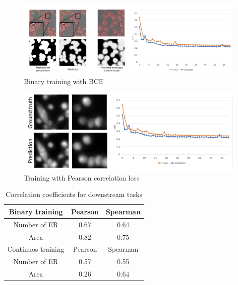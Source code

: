 \begin{figure}[htb]
	\begin{center}
		\includegraphics[width=0.8\linewidth]{bilder/gfp/binary-bce/enlarged.png}
		\caption{Binary training with BCE}\label{fig:gfp-bce-predictions}
	\end{center}
\end{figure}

\begin{figure}[htb]
	\begin{center}
		\includegraphics[width=0.6\linewidth]{bilder/gfp/predictions.png}
		\caption{Training with Pearson correlation loss}\label{fig:gfp-pcc-predictions}
	\end{center}
\end{figure}

\begin{table}[H]
    \centering
    \caption{Correlation coefficients for downstream tasks}
        \begin{adjustbox}{width=0.4\textwidth}
            \begin{tabular}{|c|c|c|}\hline
                Binary training&Pearson&Spearman
                \\\hline\hline
                Number of ER&0.67&0.64\\\hline
                Area&0.82&0.75\\\hline\hline
                Continuos training&Pearson&Spearman\\\hline
				Number of ER&0.57&0.55\\\hline
                Area&0.26&0.64\\\hline
            \end{tabular}
        \end{adjustbox}
\end{table}
